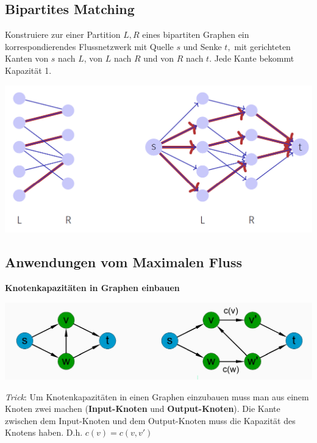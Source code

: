 \begin{sectionbox}
\subsection{Bipartites Matching}\smallskip
Konstruiere zur einer Partition $L, R$ eines bipartiten Graphen ein korrespondierendes Flussnetzwerk mit Quelle $s$ und Senke $t,$ mit gerichteten Kanten von $s$ nach $L$, von $L$ nach $R$ und von $R$ nach $t$. Jede Kante bekommt Kapazität 1.\par
\includegraphics[width = \columnwidth]{../img/biMa.png}\par\smallskip
\end{sectionbox}

\vspace{500px}

\begin{sectionbox}
\subsection{Anwendungen vom Maximalen Fluss}\medskip

\textbf{Knotenkapazitäten in Graphen einbauen}\par
\includegraphics[width = \columnwidth]{../img/KontenKap.png}\par
\textit{Trick}: Um Knotenkapazitäten in einen Graphen einzubauen muss man aus einem Knoten zwei machen (\textbf{Input-Knoten} und \textbf{Output-Knoten}). Die Kante zwischen dem Input-Knoten und dem Output-Knoten muss die Kapazität des Knotens haben. D.h. $c(v) = c(v,v')$\par\smallskip
\end{sectionbox}